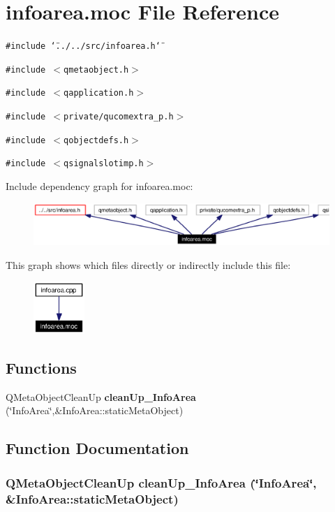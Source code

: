 \section{infoarea.moc File Reference}
\label{infoarea_8moc}


{\tt \#include \char`\"{}../../src/infoarea.h\char`\"{}}\par
{\tt \#include $<$qmetaobject.h$>$}\par
{\tt \#include $<$qapplication.h$>$}\par
{\tt \#include $<$private/qucomextra\_\-p.h$>$}\par
{\tt \#include $<$qobjectdefs.h$>$}\par
{\tt \#include $<$qsignalslotimp.h$>$}\par


Include dependency graph for infoarea.moc:\begin{figure}[H]
\begin{center}
\leavevmode
\includegraphics[width=331pt]{infoarea_8moc__incl}
\end{center}
\end{figure}


This graph shows which files directly or indirectly include this file:\begin{figure}[H]
\begin{center}
\leavevmode
\includegraphics[width=55pt]{infoarea_8moc__dep__incl}
\end{center}
\end{figure}
\subsection*{Functions}
\begin{CompactItemize}
\item 
QMeta\-Object\-Clean\-Up {\bf clean\-Up\_\-Info\-Area} (\char`\"{}Info\-Area\char`\"{},\&Info\-Area::static\-Meta\-Object)
\end{CompactItemize}


\subsection{Function Documentation}
\subsubsection{\setlength{\rightskip}{0pt plus 5cm}QMeta\-Object\-Clean\-Up clean\-Up\_\-Info\-Area (\char`\"{}Info\-Area\char`\"{}, \&Info\-Area::static\-Meta\-Object)\hspace{0.3cm}{\tt  [static]}}\label{infoarea_8moc_a0}


